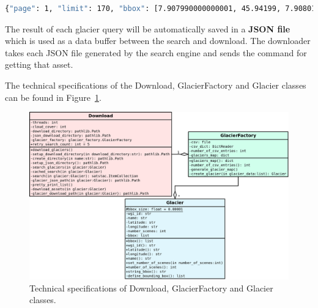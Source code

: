 \documentclass[12pt, a4paper]{report}
\begin{document}
	\begin{lstlisting}[caption={Search query created by sat-search},label={lst:query},language=Bash]
		{"page": 1, "limit": 170, "bbox": [7.907990000000001, 45.94199, 7.90801, 45.94201], "query": {"eo:cloud_cover": {"lt": 10}}, "collection": "landsat-8-l1"}
	\end{lstlisting}

	\par The result of each glacier query will be automatically saved in a \textbf{JSON file} which is used as a data buffer between the search and download. The downloader takes each JSON file generated by the search engine and sends the command for getting that asset.
	
	\par The technical specifications of the Download, GlacierFactory and Glacier classes can be found in Figure~\ref{fig:sd_diagram}.
	
	\begin{figure}[h]
		\centering
		\includegraphics[scale=0.23]{../images/sd_diagram.png}
		\caption{Technical specifications of Download, GlacierFactory and Glacier classes.}
		\label{fig:sd_diagram}
	\end{figure}
\end{document}
